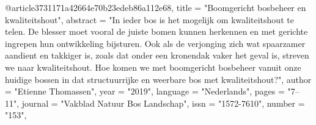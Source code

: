 
@article{3731171a42664e70b23edeb86a112e68,
title = "Boomgericht bosbeheer en kwaliteitshout",
abstract = "In ieder bos is het mogelijk om kwaliteitshout te telen. De blesser moet vooral de juiste bomen kunnen herkennen en met gerichte ingrepen hun ontwikkeling bijsturen. Ook als de verjonging zich wat spaarzamer aandient en takkiger is, zoals dat onder een kronendak vaker het geval is, streven we naar kwaliteitshout. Hoe komen we met boomgericht bosbeheer vanuit onze huidige bossen in dat structuurrijke en weerbare bos met kwaliteitshout?",
author = "Etienne Thomassen",
year = "2019",
language = "Nederlands",
pages = "7--11",
journal = "Vakblad Natuur Bos Landschap",
issn = "1572-7610",
number = "153",
}
